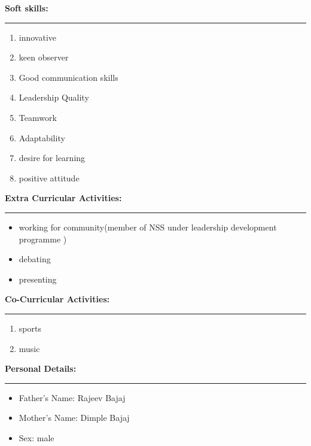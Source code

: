 \documentclass[a4paper,10pt]{article}
\begin{document}
\begin{flushleft}
    \newpage
     \textbf{Soft skills:}\\
  \hrule
    \begin{enumerate}
    \item innovative\\
    \item keen observer\\
    	\item Good communication skills\\
    	\item Leadership Quality\\
    	\item Teamwork \\
    	\item Adaptability\\
    	\item  desire for learning\\
    	\item positive attitude\\
    \end{enumerate}
    \textbf{Extra Curricular Activities:}\\
  \hrule
  
   
  
  \begin{itemize}
  	\item working for community(member of NSS under leadership development programme )
  \item debating
   \item presenting
  	
  \end{itemize}
\textbf{Co-Curricular Activities:}\\
  \hrule
  
   
  
  \begin{enumerate}
  
 
  	\item sports
  \item music
  	 \end{enumerate}
  	 \textbf{Personal Details:}\\
   \hrule
   
    \begin{itemize}
    	\item Father's Name:     Rajeev Bajaj\\
    	\item Mother's Name:     Dimple Bajaj\\
    	\item Sex:               male\\
    	

\end{itemize}
\end{flushleft}
\end{document}
